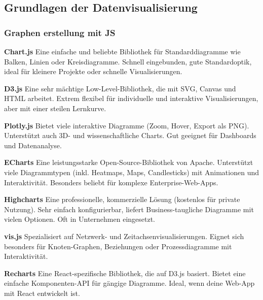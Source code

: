 \subsection{Grundlagen der Datenvisualisierung}
\label{subsec:grundlagen-der-datenvisualisierung}



\subsubsection{Graphen erstellung mit JS}


\textbf{Chart.js}
Eine einfache und beliebte Bibliothek für Standarddiagramme wie Balken, Linien
oder Kreisdiagramme. Schnell eingebunden, gute Standardoptik, ideal für
kleinere Projekte oder schnelle Visualisierungen.

\textbf{D3.js}
Eine sehr mächtige Low-Level-Bibliothek, die mit SVG, Canvas und HTML arbeitet.
Extrem flexibel für individuelle und interaktive Visualisierungen, aber mit
einer steilen Lernkurve.

\textbf{Plotly.js}
Bietet viele interaktive Diagramme (Zoom, Hover, Export als PNG). Unterstützt
auch 3D- und wissenschaftliche Charts. Gut geeignet für Dashboards und
Datenanalyse.

\textbf{ECharts}
Eine leistungsstarke Open-Source-Bibliothek von Apache. Unterstützt viele
Diagrammtypen (inkl. Heatmaps, Maps, Candlesticks) mit Animationen und
Interaktivität. Besonders beliebt für komplexe Enterprise-Web-Apps.

\textbf{Highcharts}
Eine professionelle, kommerzielle Lösung (kostenlos für private Nutzung). Sehr
einfach konfigurierbar, liefert Business-taugliche Diagramme mit vielen
Optionen. Oft in Unternehmen eingesetzt.

\textbf{vis.js}
Spezialisiert auf Netzwerk- und Zeitachsenvisualisierungen. Eignet sich
besonders für Knoten-Graphen, Beziehungen oder Prozessdiagramme mit
Interaktivität.

\textbf{Recharts}
Eine React-spezifische Bibliothek, die auf D3.js basiert.
Bietet eine einfache Komponenten-API für gängige Diagramme.
Ideal, wenn deine Web-App mit React entwickelt ist.



